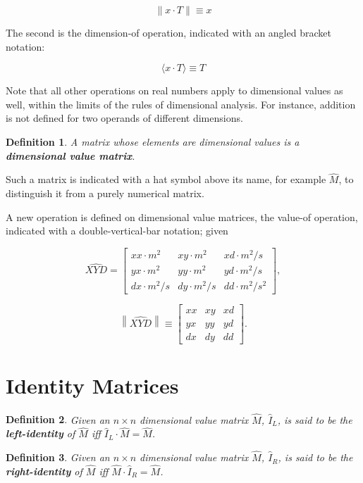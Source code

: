 \documentclass[10pt,letterpaper]{article}
\newtheorem{defn}{Definition}[section]
\numberwithin{equation}{section}
\begin{document}
\[ \| x \cdot T \| \equiv x \]

The second is the dimension-of operation, indicated with an angled
bracket notation:

\[ \langle x \cdot T \rangle \equiv T \]

Note that all other operations on real numbers apply to dimensional
values as well, within the limits of the rules of dimensional
analysis.  For instance, addition is not defined for two operands of
different dimensions.


\begin{defn}A matrix whose elements are dimensional values is a
  \textbf{dimensional value matrix}.\end{defn}

Such a matrix is indicated with a hat symbol above its name, for
example $\hat M$, to distinguish it from a purely numerical matrix.

A new operation is defined on dimensional value matrices, the value-of
operation, indicated with a double-vertical-bar notation; given

\[ \widehat{XYD} = \left[ \begin{matrix} 
  xx \cdot m^2 & xy \cdot m^2 & xd \cdot m^2/s \\
  yx \cdot m^2 & yy \cdot m^2 & yd \cdot m^2/s \\
  dx \cdot m^2/s & dy \cdot m^2/s & dd \cdot m^2/s^2
 \end{matrix} \right], \]
 
 \[ \left\| \widehat{XYD} \right\| \equiv \left[ \begin{matrix} 
  xx & xy & xd \\
  yx & yy & yd \\
  dx & dy & dd
 \end{matrix} \right]. \]
 
\section{Identity Matrices}

\begin{defn}Given an $n \times n$ dimensional value matrix $\hat M$,
  $\hat I_L$, is said to be the \textbf{left-identity} of $\hat M$ iff
  $\hat I_L \cdot \hat M = \hat M$.\end{defn}

\begin{defn}Given an $n \times n$ dimensional value matrix $\hat M$,
  $\hat I_R$, is said to be the \textbf{right-identity} of $\hat M$
  iff $\hat M \cdot \hat I_R = \hat M$.\end{defn}
\end{document}
